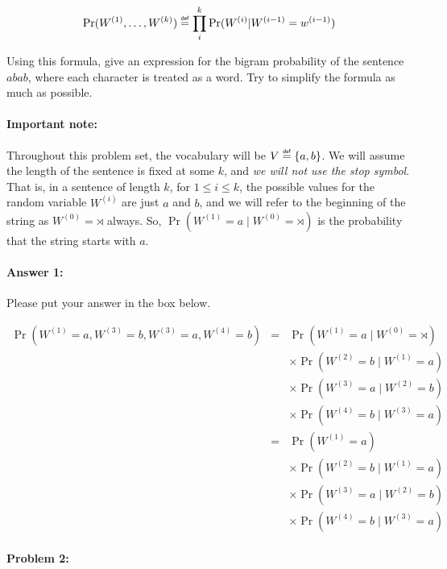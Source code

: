 \documentclass[10pt]{article}
\newenvironment{AnswerBox}{\begin{mdframed}[style=simple]}{\end{mdframed}}
\newcommand\defeq{\mathrel{\overset{\makebox[0pt]{\mbox{\normalfont\tiny\sffamily def}}}{=}}}
\begin{document}
\begin{equation}\label{eq:bigram}
\Pr(W^{(1)},\dots,W^{(k)})
\defeq\prod_i^k \Pr(W^{(i)} | W^{(i-1)}=w^{(i-1)})
\end{equation}

 Using this formula, give an expression for the bigram
probability of the sentence $abab$, where each character is treated as
a word. Try to simplify the formula as much as possible.

\paragraph{Important note:} Throughout this problem set, the vocabulary will be
$V\defeq\{a,b\}$. We will assume the length of the sentence is fixed at some $k$,
and \emph{we will not use the stop symbol}.  
That is, in a sentence of length $k$, for $1 \le i \le k$, the possible
values for the random variable $W^{(i)}$ are just $a$ and $b$, and we 
will refer to the beginning of the string as  $W^{(0)} = \rtimes$ always.
So, $\Pr(W^{(1)}=a \mid W^{(0)}=\rtimes)$ is
the probability that the string starts with $a$.

\paragraph{Answer 1:} Please put your answer in the box below.

\begin{AnswerBox}%
\begin{eqnarray*}\label{bigram:abab}
    \Pr(W^{(1)}=a, W^{(3)}=b, W^{(3)}=a, W^{(4)}=b) & = & \Pr(W^{(1)}=a \mid W^{(0)}=\rtimes) \\
    & & \times \Pr(W^{(2)}=b \mid W^{(1)}=a) \\
    & & \times \Pr(W^{(3)}=a \mid W^{(2)}=b) \\
    & & \times \Pr(W^{(4)}=b \mid W^{(3)}=a) \\
    & = & \Pr(W^{(1)}=a) \\
    & & \times  \Pr(W^{(2)}=b \mid W^{(1)}=a) \\
    & & \times \Pr(W^{(3)}=a \mid W^{(2)}=b) \\
    & & \times \Pr(W^{(4)}=b \mid W^{(3)}=a)
\end{eqnarray*}
\end{AnswerBox}%

\hrulefill %

\paragraph{Problem 2:}
\end{document}

